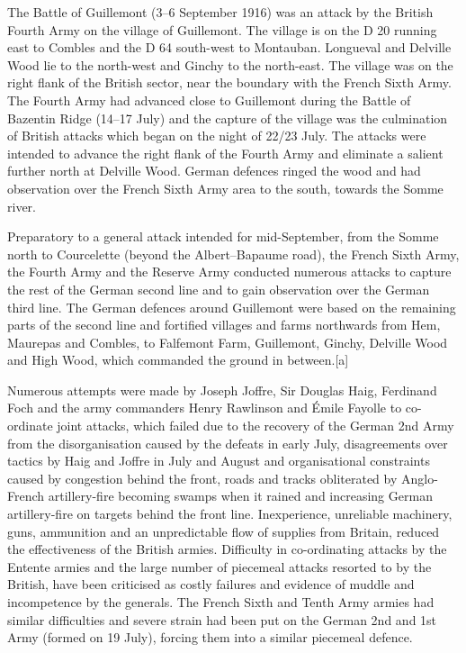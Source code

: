 \documentclass[a4paper,]{book}
\begin{document}
The Battle of Guillemont (3–6 September 1916) was an attack by the British Fourth Army on the village of Guillemont. The village is on the D 20 running east to Combles and the D 64 south-west to Montauban. Longueval and Delville Wood lie to the north-west and Ginchy to the north-east. The village was on the right flank of the British sector, near the boundary with the French Sixth Army. The Fourth Army had advanced close to Guillemont during the Battle of Bazentin Ridge (14–17 July) and the capture of the village was the culmination of British attacks which began on the night of 22/23 July. The attacks were intended to advance the right flank of the Fourth Army and eliminate a salient further north at Delville Wood. German defences ringed the wood and had observation over the French Sixth Army area to the south, towards the Somme river.

Preparatory to a general attack intended for mid-September, from the Somme north to Courcelette (beyond the Albert–Bapaume road), the French Sixth Army, the Fourth Army and the Reserve Army conducted numerous attacks to capture the rest of the German second line and to gain observation over the German third line. The German defences around Guillemont were based on the remaining parts of the second line and fortified villages and farms northwards from Hem, Maurepas and Combles, to Falfemont Farm, Guillemont, Ginchy, Delville Wood and High Wood, which commanded the ground in between.[a]

Numerous attempts were made by Joseph Joffre, Sir Douglas Haig, Ferdinand Foch and the army commanders Henry Rawlinson and Émile Fayolle to co-ordinate joint attacks, which failed due to the recovery of the German 2nd Army from the disorganisation caused by the defeats in early July, disagreements over tactics by Haig and Joffre in July and August and organisational constraints caused by congestion behind the front, roads and tracks obliterated by Anglo-French artillery-fire becoming swamps when it rained and increasing German artillery-fire on targets behind the front line. Inexperience, unreliable machinery, guns, ammunition and an unpredictable flow of supplies from Britain, reduced the effectiveness of the British armies. Difficulty in co-ordinating attacks by the Entente armies and the large number of piecemeal attacks resorted to by the British, have been criticised as costly failures and evidence of muddle and incompetence by the generals. The French Sixth and Tenth Army armies had similar difficulties and severe strain had been put on the German 2nd and 1st Army (formed on 19 July), forcing them into a similar piecemeal defence.
\end{document}
